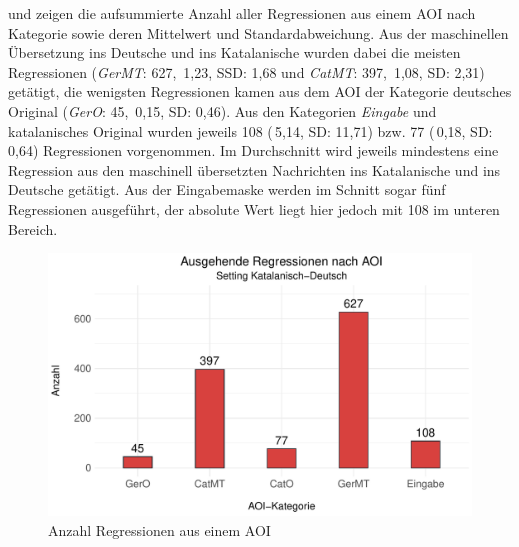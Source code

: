 


\label{K6:para:catde:regout}


 und  zeigen die aufsummierte Anzahl aller Regressionen aus einem AOI nach Kategorie sowie deren Mittelwert und Standardabweichung. Aus der maschinellen Übersetzung ins Deutsche und ins Katalanische wurden dabei die meisten Regressionen (\emph{GerMT}: 627, \diameter\,1,23, SSD: 1,68 und \emph{CatMT}: 397, \diameter\,1,08, SD: 2,31) getätigt, die wenigsten Regressionen kamen aus dem AOI der Kategorie deutsches Original (\emph{GerO}: 45, \diameter\,0,15, SD: 0,46). Aus den Kategorien \emph{Eingabe} und katalanisches Original wurden jeweils 108 (\diameter\,5,14, SD: 11,71) bzw. 77 (\diameter\,0,18, SD: 0,64) Regressionen vorgenommen. Im Durchschnitt wird jeweils mindestens eine Regression aus den maschinell übersetzten Nachrichten ins Katalanische und ins Deutsche getätigt. Aus der Eingabemaske werden im Schnitt sogar fünf Regressionen ausgeführt, der absolute Wert liegt hier jedoch mit 108 im unteren Bereich.


\begin{figure}
	\centerline{\includegraphics[width=.85\textwidth]{Figures/EyeTracking/CatDe/ggplot_regression_OUT_AOI_de}}
	\caption{Anzahl Regressionen aus einem AOI\label{K6:fig:CatDe:RegOut-AOI-Count}}
\end{figure}

